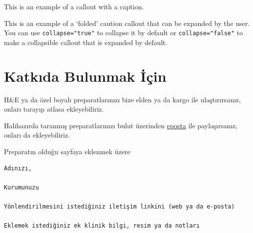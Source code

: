 \documentclass[
  letterpaper,
  DIV=11,
  numbers=noendperiod]{scrreprt}
\begin{document}
\begin{tcolorbox}[enhanced jigsaw, toptitle=1mm, arc=.35mm, titlerule=0mm, colframe=quarto-callout-tip-color-frame, rightrule=.15mm, opacitybacktitle=0.6, colbacktitle=quarto-callout-tip-color!10!white, toprule=.15mm, leftrule=.75mm, coltitle=black, breakable, bottomtitle=1mm, opacityback=0, title=\textcolor{quarto-callout-tip-color}{\faLightbulb}\hspace{0.5em}{Tip With Caption}, bottomrule=.15mm, left=2mm, colback=white]
This is an example of a callout with a caption.
\end{tcolorbox}

\begin{tcolorbox}[enhanced jigsaw, toptitle=1mm, arc=.35mm, titlerule=0mm, colframe=quarto-callout-caution-color-frame, rightrule=.15mm, opacitybacktitle=0.6, colbacktitle=quarto-callout-caution-color!10!white, toprule=.15mm, leftrule=.75mm, coltitle=black, breakable, bottomtitle=1mm, opacityback=0, title=\textcolor{quarto-callout-caution-color}{\faFire}\hspace{0.5em}{Expand To Learn About Collapse}, bottomrule=.15mm, left=2mm, colback=white]
This is an example of a `folded' caution callout that can be expanded by
the user. You can use \texttt{collapse="true"} to collapse it by default
or \texttt{collapse="false"} to make a collapsible callout that is
expanded by default.
\end{tcolorbox}

\hypertarget{katkux131da-bulunmak-iuxe7in}{%
\chapter{Katkıda Bulunmak İçin}\label{katkux131da-bulunmak-iuxe7in}}

H\&E ya da özel boyalı preparatlarınızı bize elden ya da kargo ile
ulaştırırsanız, onları tarayıp atlasa ekleyebiliriz.

Halihazırda taranmış preparatlarınızı bulut üzerinden
\href{mailto:bilgi@patolojiatlasi.com}{eposta} ile paylaşırsanız, onları
da ekleyebiliriz.

Preparatın olduğu sayfaya eklenmek üzere

\begin{verbatim}
Adınızı,

Kurumunuzu

Yönlendirilmesini istediğiniz iletişim linkini (web ya da e-posta)

Eklemek istediğiniz ek klinik bilgi, resim ya da notları
\end{verbatim}
\end{document}
